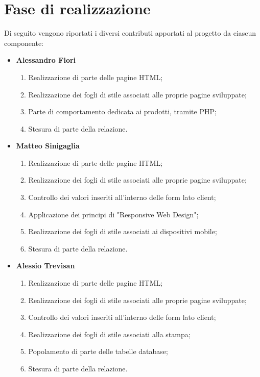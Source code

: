 \newpage
\section{Fase di realizzazione}
Di seguito vengono riportati i diversi contributi apportati al progetto da ciascun componente:
\begin{itemize}
    \item \textbf{Alessandro Flori} \begin{enumerate}
        \item Realizzazione di parte delle pagine HTML;
        \item Realizzazione dei fogli di stile associati alle proprie pagine sviluppate;
        \item Parte di comportamento dedicata ai prodotti, tramite PHP;
        \item Stesura di parte della relazione.
    \end{enumerate}
     \item \textbf{Matteo Sinigaglia} \begin{enumerate}
        \item Realizzazione di parte delle pagine HTML;
        \item Realizzazione dei fogli di stile associati alle proprie pagine sviluppate;
        \item Controllo dei valori inseriti all'interno delle form lato client;
        \item Applicazione dei principi di "Responsive Web Design";
        \item Realizzazione dei fogli di stile associati ai dispositivi mobile;
        \item Stesura di parte della relazione.
    \end{enumerate}
     \item \textbf{Alessio Trevisan} \begin{enumerate}
        \item Realizzazione di parte delle pagine HTML;
        \item Realizzazione dei fogli di stile associati alle proprie pagine sviluppate;
        \item Controllo dei valori inseriti all'interno delle form lato client;
        \item Realizzazione dei fogli di stile associati alla stampa;
        \item Popolamento di parte delle tabelle database;
        \item Stesura di parte della relazione.

\end{enumerate}
\end{itemize}
